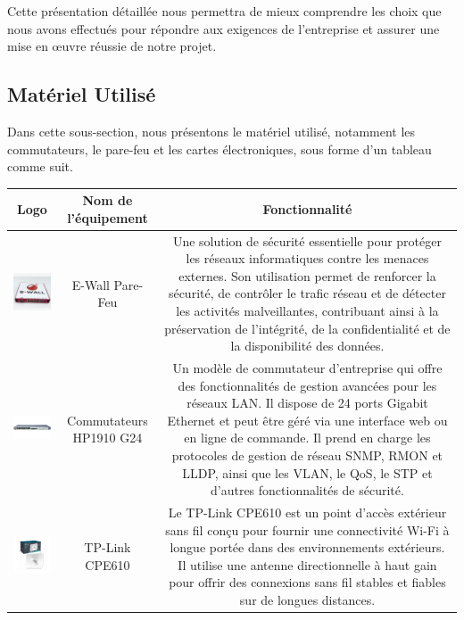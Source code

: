 Cette présentation détaillée nous permettra de mieux comprendre les choix que nous avons effectués pour répondre aux exigences de l'entreprise et assurer une mise en œuvre réussie de notre projet. \\

\subsection{Matériel Utilisé}

Dans cette sous-section, nous présentons le matériel utilisé, notamment les commutateurs, le pare-feu et les cartes électroniques, sous forme d'un tableau comme suit.


\begin{table}[H]
\begin{center}
\begin{tabular}{|c{3cm}|c{3cm}|c{10cm}|}
\hline
\textbf{Logo}         & \textbf{Nom de l'équipement}   & \textbf{Fonctionnalité} \\
\hline
\includegraphics[width=3cm]{Images/ewall.jpg} & E-Wall Pare-Feu & Une solution de sécurité essentielle pour protéger les réseaux informatiques contre les menaces externes. Son utilisation permet de renforcer la sécurité, de contrôler le trafic réseau et de détecter les activités malveillantes, contribuant ainsi à la préservation de l'intégrité, de la confidentialité et de la disponibilité des données. \\
\hline
\includegraphics[width=3cm]{Images/HP1910.jpg} & Commutateurs HP1910 G24 & Un modèle de commutateur d'entreprise qui offre des fonctionnalités de gestion avancées pour les réseaux LAN. Il dispose de 24 ports Gigabit Ethernet et peut être géré via une interface web ou en ligne de commande. Il prend en charge les protocoles de gestion de réseau SNMP, RMON et LLDP, ainsi que les VLAN, le QoS, le STP et d'autres fonctionnalités de sécurité.  \\
\hline
\includegraphics[width=3cm]{Images/TP-Link-CPE610-5GHz_1.png} & TP-Link CPE610 & Le TP-Link CPE610 est un point d'accès extérieur sans fil conçu pour fournir une connectivité Wi-Fi à longue portée dans des environnements extérieurs. Il utilise une antenne directionnelle à haut gain pour offrir des connexions sans fil stables et fiables sur de longues distances.  \\

\end{tabular}
\end{center}
\end{table}
